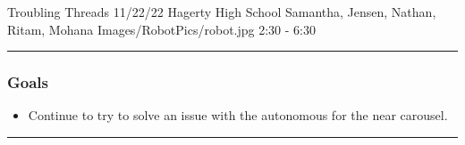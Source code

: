 \insertmeeting 
	{Troubling Threads} 
	{11/22/22} 
	{Hagerty High School}
	{Samantha, Jensen, Nathan, Ritam, Mohana}
	{Images/RobotPics/robot.jpg}
	{2:30 - 6:30}

\noindent\hfil\rule{\textwidth}{.4pt}\hfil
\subsubsection*{Goals}
\begin{itemize}
    \item Continue to try to solve an issue with the autonomous for the near carousel. 

\end{itemize} 

\noindent\hfil\rule{\textwidth}{.4pt}\hfil

